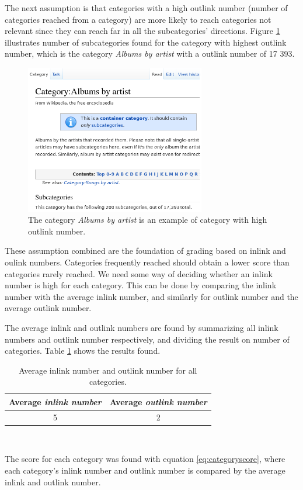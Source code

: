 The next assumption is that categories with a high outlink number (number of categories reached from a category) are more likely to reach categories not relevant since they can reach far in all the subcategories' directions. Figure \ref{fig:high_outlink_number} illustrates number of subcategories found for the category with highest outlink number, which is the category \emph{Albums by artist} with a outlink number of 17 393. 


\begin{figure}[h]
\centering
\includegraphics[width=0.7\textwidth]{Chapters/Implementation/Grading/high_outlink_number}
\caption[Example of category with high \emph{outlink number}]{The category \emph{Albums by artist} is an example of category with high outlink number. }
\label{fig:high_outlink_number}
\end{figure}


These assumption combined are the foundation of grading based on inlink and oulink numbers. Categories frequently reached should obtain a lower score than categories rarely reached. We need some way of deciding whether an inlink number is high for each category. This can be done by comparing the inlink number with the average inlink number, and similarly for outlink number and the average outlink number. 


The average inlink and outlink numbers are found by summarizing all inlink numbers and outlink number respectively, and dividing the result on number of categories. Table \ref{tab:avginlinkoutlink} shows the results found. 


\begin{table}[ht]
\centering
\renewcommand{\arraystretch}{1.25}
\begin{tabular}{c |c}
\textbf{Average \emph{inlink number}} & \textbf{Average \emph{outlink number}}\\ \hline
 5 & 2 
\end{tabular}
\\[10pt]
\caption{Average inlink number and outlink number for all categories.}
\label{tab:avginlinkoutlink}
\end{table}
The score for each category was found with equation \ref{eq:categoryscore}, where each category's inlink number and outlink number is compared by the average inlink and outlink number.

